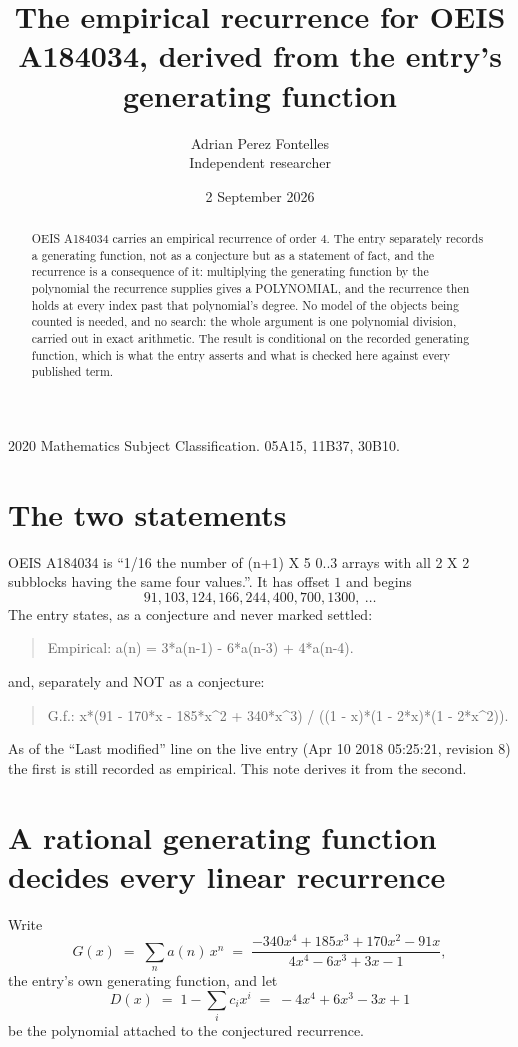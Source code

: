 \documentclass[11pt,a4paper]{article}
\title{The empirical recurrence for OEIS A184034, derived from the entry's generating function}
\author{Adrian Perez Fontelles\\ \small Independent researcher}
\date{2 September 2026}
\theoremstyle{plain}
\theoremstyle{definition}
\begin{document}
\maketitle

\begin{abstract}
OEIS A184034 carries an empirical recurrence of order $4$. The entry separately records a
generating function, not as a conjecture but as a statement of fact, and the recurrence is a
consequence of it: multiplying the generating function by the polynomial the recurrence
supplies gives a POLYNOMIAL, and the recurrence then holds at every index past that
polynomial's degree. No model of the objects being counted is needed, and no search: the
whole argument is one polynomial division, carried out in exact arithmetic. The result is
conditional on the recorded generating function, which is what the entry asserts and what is
checked here against every published term.
\end{abstract}

\noindent\small 2020 Mathematics Subject Classification. 05A15, 11B37, 30B10.\normalsize

\section{The two statements}

OEIS A184034 is ``1/16 the number of (n+1) X 5 0..3 arrays with all 2 X 2 subblocks having the same four values.''. It has offset $1$ and begins
\[
91, 103, 124, 166, 244, 400, 700, 1300,\ \dots
\]
The entry states, as a conjecture and never marked settled:
\begin{quote}
Empirical: a(n) = 3*a(n-1) - 6*a(n-3) + 4*a(n-4).
\end{quote}
and, separately and NOT as a conjecture:
\begin{quote}
G.f.: x*(91 - 170*x - 185*x\^{}2 + 340*x\^{}3) / ((1 - x)*(1 - 2*x)*(1 - 2*x\^{}2)).
\end{quote}
As of the ``Last modified'' line on the live entry (Apr 10 2018 05:25:21, revision 8) the first is still
recorded as empirical. This note derives it from the second.

\section{A rational generating function decides every linear recurrence}

Write
\[
G(x)\;=\;\sum_{n}a(n)\,x^{n}\;=\;\frac{- 340 x^{4} + 185 x^{3} + 170 x^{2} - 91 x}{4 x^{4} - 6 x^{3} + 3 x - 1},
\]
the entry's own generating function, and let
\[
D(x)\;=\;1-\sum_i c_i x^{i}\;=\;- 4 x^{4} + 6 x^{3} - 3 x + 1
\]
be the polynomial attached to the conjectured recurrence.
\end{document}
